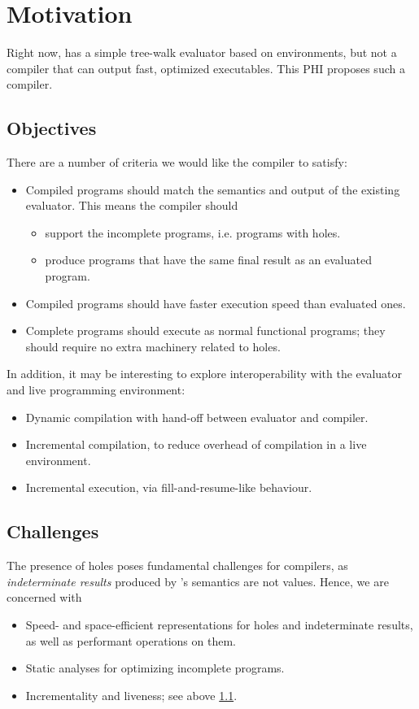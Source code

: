 \documentclass[index.tex]{subfiles}
\begin{document}
\section{Motivation}
\label{motivation}
Right now, \Hazel{} has a simple tree-walk evaluator based on environments, but not a compiler that
can output fast, optimized executables. This PHI proposes such a compiler.

\subsection{Objectives}
\label{objectives}
There are a number of criteria we would like the compiler to satisfy: 
%
\begin{itemize}
  \item Compiled programs should match the semantics and output of the existing evaluator. This
    means the compiler should
    \begin{itemize}
      \item support the incomplete programs, i.e. programs with holes.
      \item produce programs that have the same final result as an evaluated program.
    \end{itemize}

  \item Compiled programs should have faster execution speed than evaluated ones.
  \item Complete \Hazel{} programs should execute as normal functional programs; they should require
    no extra machinery related to holes.
\end{itemize}
%
In addition, it may be interesting to explore interoperability with the evaluator and live
programming environment:
%
\begin{itemize}
  \item Dynamic compilation with hand-off between evaluator and compiler.
  \item Incremental compilation, to reduce overhead of compilation in a live environment.
  \item Incremental execution, via fill-and-resume-like behaviour.
\end{itemize}

\subsection{Challenges}
\label{challenges}
The presence of holes poses fundamental challenges for compilers, as \emph{indeterminate results}
produced by \Hazel's semantics are not values. Hence, we are concerned with
%
\begin{itemize}
  \item Speed- and space-efficient representations for holes and indeterminate results, as well as
    performant operations on them.
  \item Static analyses for optimizing incomplete programs.
  \item Incrementality and liveness; see above \cref{objectives}.
\end{itemize}
\end{document}
